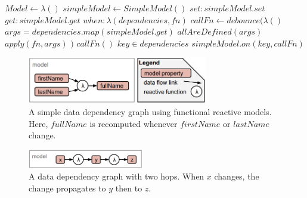 \begin{codebox}
\li $Model \gets \lambda()$
\Do
  \li $simpleModel \gets SimpleModel()$
  \li \Return
  \Do
    \li $set: simpleModel.set$
    \li $get: simpleModel.get$
    \li $when: \lambda(dependencies, fn)$
    \Do
      \li $callFn \gets debounce(\lambda()$
      \Do
        \li $args = dependencies.map(simpleModel.get)$
        \li \If $allAreDefined(args)$
        \Do
          \li $apply(fn, args)$
        \End
      \End
      \li $)$
      \li $callFn()$
      \li \For $key \in dependencies$
      \Do
        \li $simpleModel.on(key, callFn)$
      \End  
    \End
  \End
\End
\end{codebox}
\begin{figure}[h]
  \caption{A simple data dependency graph using functional reactive models. Here, $fullName$ is recomputed whenever $firstName$ or $lastName$ change.}
  \centering
  \includegraphics[width=0.7\textwidth]{figures/computedProperty.png}
\end{figure}
\begin{figure}[h]
  \caption{A data dependency graph with two hops. When $x$ changes, the change propagates to $y$ then to $z$.}
  \centering
  \includegraphics[width=0.45\textwidth]{figures/dependencyGraph.png}
\end{figure}

